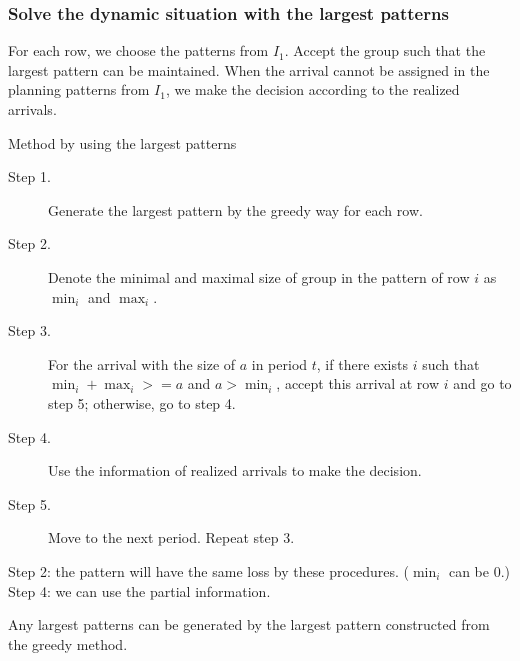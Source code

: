 \subsubsection{Solve the dynamic situation with the largest patterns}\label{largest_pattern}



For each row, we choose the patterns from $I_1$. Accept the group such that the largest pattern can be maintained. When the arrival cannot be assigned in the planning patterns from $I_1$, we make the decision according to the realized arrivals.



\begin{algorithm}[H]\label{algo_largest}
  \caption{Method by using the largest patterns}
  \begin{description}
    \item[Step 1.] Generate the largest pattern by the greedy way for each row.
    \item[Step 2.] Denote the minimal and maximal size of group in the pattern of row $i$ as $\min_i$ and $\max_i$. 
    \item[Step 3.] For the arrival with the size of $a$ in period $t$, if there exists $i$ such that $\min_i + \max_i >= a$ and $a > \min_i$, accept this arrival at row $i$ and go to step 5; otherwise, go to step 4.
    \item[Step 4.] Use the information of realized arrivals to make the decision.
    \item[Step 5.] Move to the next period. Repeat step 3. 
  \end{description}
\end{algorithm}

Step 2: the pattern will have the same loss by these procedures. ($\min_i$ can be 0.)
Step 4: we can use the partial information.

\begin{lem}
  Any largest patterns can be generated by the largest pattern constructed from the greedy method.
\end{lem}

